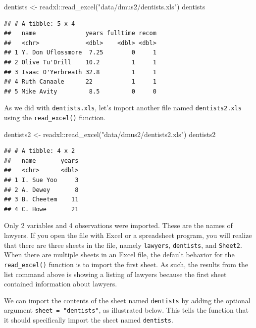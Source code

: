 \documentclass[
]{book}
\newenvironment{Shaded}{\begin{snugshade}}{\end{snugshade}}
\newcommand{\FunctionTok}[1]{\textcolor[rgb]{0.00,0.00,0.00}{#1}}
\newcommand{\NormalTok}[1]{#1}
\newcommand{\OtherTok}[1]{\textcolor[rgb]{0.56,0.35,0.01}{#1}}
\newcommand{\SpecialCharTok}[1]{\textcolor[rgb]{0.00,0.00,0.00}{#1}}
\newcommand{\StringTok}[1]{\textcolor[rgb]{0.31,0.60,0.02}{#1}}
\begin{document}
\begin{Shaded}
\begin{Highlighting}[]
\NormalTok{dentists }\OtherTok{\textless{}{-}}\NormalTok{ readxl}\SpecialCharTok{::}\FunctionTok{read\_excel}\NormalTok{(}\StringTok{"data/dmus2/dentists.xls"}\NormalTok{)}
\NormalTok{dentists}
\end{Highlighting}
\end{Shaded}

\begin{verbatim}
## # A tibble: 5 x 4
##   name              years fulltime recom
##   <chr>             <dbl>    <dbl> <dbl>
## 1 Y. Don Uflossmore  7.25        0     1
## 2 Olive Tu'Drill    10.2         1     1
## 3 Isaac O'Yerbreath 32.8         1     1
## 4 Ruth Canaale      22           1     1
## 5 Mike Avity         8.5         0     0
\end{verbatim}

As we did with \texttt{dentists.xls}, let's import another file named \texttt{dentists2.xls} using the \texttt{read\_excel()} function.

\begin{Shaded}
\begin{Highlighting}[]
\NormalTok{dentists2 }\OtherTok{\textless{}{-}}\NormalTok{ readxl}\SpecialCharTok{::}\FunctionTok{read\_excel}\NormalTok{(}\StringTok{"data/dmus2/dentists2.xls"}\NormalTok{)}
\NormalTok{dentists2}
\end{Highlighting}
\end{Shaded}

\begin{verbatim}
## # A tibble: 4 x 2
##   name       years
##   <chr>      <dbl>
## 1 I. Sue Yoo     3
## 2 A. Dewey       8
## 3 B. Cheetem    11
## 4 C. Howe       21
\end{verbatim}

Only 2 variables and 4 observations were imported. These are the names of lawyers. If you open the file with Excel or a spreadsheet program, you will realize that there are three sheets in the file, namely \texttt{lawyers}, \texttt{dentists}, and \texttt{Sheet2}. When there are multiple sheets in an Excel file, the default behavior for the \texttt{read\_excel()} function is to import the first sheet. As such, the results from the list command above is showing a listing of lawyers because the first sheet contained information about lawyers.

We can import the contents of the sheet named \texttt{dentists} by adding the optional argument \texttt{sheet\ =\ "dentists"}, as illustrated below. This tells the function that it should specifically import the sheet named \texttt{dentists}.
\end{document}
